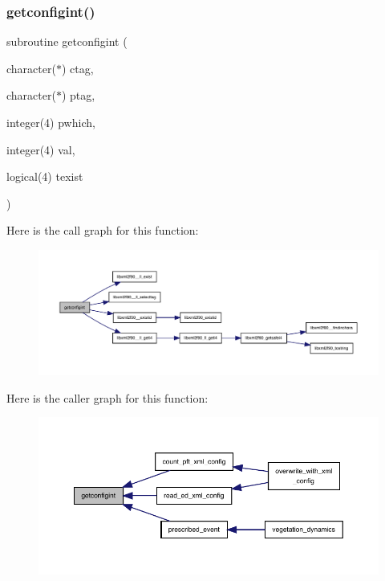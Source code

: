 \subsubsection{\texorpdfstring{getconfigint()}{getconfigint()}}
{\footnotesize\ttfamily subroutine getconfigint (\begin{DoxyParamCaption}\item[{character($\ast$)}]{ctag,  }\item[{character($\ast$)}]{ptag,  }\item[{integer(4)}]{pwhich,  }\item[{integer(4)}]{val,  }\item[{logical(4)}]{texist }\end{DoxyParamCaption})}

Here is the call graph for this function\+:
\nopagebreak
\begin{figure}[H]
\begin{center}
\leavevmode
\includegraphics[width=350pt]{ed__xml__config_8f90_a949b85c800477675f7d27e9e02d2d501_cgraph}
\end{center}
\end{figure}
Here is the caller graph for this function\+:
\nopagebreak
\begin{figure}[H]
\begin{center}
\leavevmode
\includegraphics[width=350pt]{ed__xml__config_8f90_a949b85c800477675f7d27e9e02d2d501_icgraph}
\end{center}
\end{figure}
\mbox{\label{ed__xml__config_8f90_a954b3037e7eb894975c79fed7627dfb0}} 
